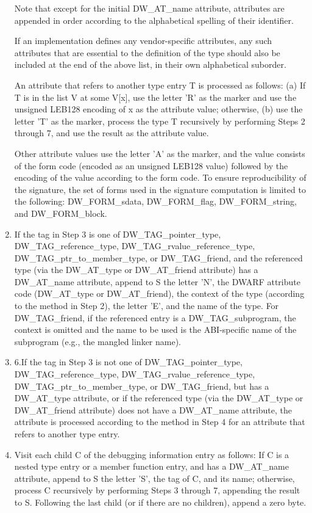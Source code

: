 \begin{enumerate}[1.]
Note that except for the initial DW\_AT\_name attribute,
attributes are appended in order according to the alphabetical
spelling of their identifier.

If an implementation defines any vendor-specific attributes,
any such attributes that are essential to the definition of
the type should also be included at the end of the above list,
in their own alphabetical suborder.

An attribute that refers to another type entry T is processed
as follows: (a) If T is in the list V at some V[x], use the
letter 'R' as the marker and use the unsigned LEB128 encoding
of x as the attribute value; otherwise, (b) use the letter 'T'
as the marker, process the type T recursively by performing
Steps 2 through 7, and use the result as the attribute value.

Other attribute values use the letter 'A' as the marker, and
the value consists of the form code (encoded as an unsigned
LEB128 value) followed by the encoding of the value according
to the form code. To ensure reproducibility of the signature,
the set of forms used in the signature computation is limited
to the following: DW\_FORM\_sdata, 
DW\_FORM\_flag, 
DW\_FORM\_string,
and DW\_FORM\_block.

\item If the tag in Step 3 is one of DW\-\_TAG\-\_pointer\-\_type,
DW\-\_TAG\-\_reference\-\_type, 
DW\-\_TAG\-\_rvalue\-\_reference\-\_type,
DW\-\_TAG\-\_ptr\-\_to\-\_member\-\_type, 
or DW\-\_TAG\-\_friend, and the referenced
type (via the DW\-\_AT\-\_type or 
DW\-\_AT\-\_friend attribute) has a
DW\-\_AT\-\_name attribute, append to S the letter 'N', the DWARF
attribute code (DW\-\_AT\-\_type or 
DW\-\_AT\-\_friend), the context of
the type (according to the method in Step 2), the letter 'E',
and the name of the type. For DW\-\_TAG\-\_friend, if the referenced
entry is a DW\-\_TAG\-\_subprogram, the context is omitted and the
name to be used is the ABI-specific name of the subprogram
(e.g., the mangled linker name).


\item 6.If the tag in Step 3 is not one of DW\-\_TAG\-\_pointer\-\_type,
DW\-\_TAG\-\_reference\-\_type, 
DW\-\_TAG\-\_rvalue\-\_reference\-\_type,
DW\-\_TAG\-\_ptr\-\_to\-\_member\-\_type, or 
DW\-\_TAG\-\_friend, but has
a DW\-\_AT\-\_type attribute, or if the referenced type (via
the DW\-\_AT\-\_type or 
DW\-\_AT\-\_friend attribute) does not have a
DW\-\_AT\-\_name attribute, the attribute is processed according to
the method in Step 4 for an attribute that refers to another
type entry.


\item Visit each child C of the debugging information
entry as follows: If C is a nested type entry or a member
function entry, and has a DW\-\_AT\-\_name attribute, append to
S the letter 'S', the tag of C, and its name; otherwise,
process C recursively by performing Steps 3 through 7,
appending the result to S. Following the last child (or if
there are no children), append a zero byte.
\end{enumerate}



